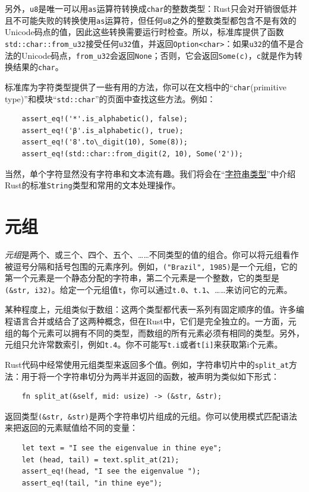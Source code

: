 另外，\texttt{u8}是唯一可以用\texttt{as}运算符转换成\texttt{char}的整数类型：Rust只会对开销很低并且不可能失败的转换使用\texttt{as}运算符，但任何\texttt{u8}之外的整数类型都包含不是有效的Unicode码点的值，因此这些转换需要运行时检查。所以，标准库提供了函数\texttt{std::char::from\_u32}接受任何\texttt{u32}值，并返回\texttt{Option<char>}：如果\texttt{u32}的值不是合法的Unicode码点，\texttt{from\_u32}会返回\texttt{None}；否则，它会返回\texttt{Some(c)}，\texttt{c}就是作为转换结果的\texttt{char}。

标准库为字符类型提供了一些有用的方法，你可以在文档中的“\texttt{char}(primitive type)”和模块“\texttt{std::char}”的页面中查找这些方法。例如：
\begin{verbatim}
    assert_eq!('*'.is_alphabetic(), false);
    assert_eq!('β'.is_alphabetic(), true);
    assert_eq!('8'.to\_digit(10), Some(8));
    assert_eq!(std::char::from_digit(2, 10), Some('2'));
\end{verbatim}

当然，单个字符显然没有字符串和文本流有趣。我们将会在“\hyperref[string]{字符串类型}”中介绍Rust的标准\texttt{String}类型和常用的文本处理操作。

\section{元组}
\emph{元组}是两个、或三个、四个、五个、……不同类型的值的组合。你可以将元组看作被逗号分隔和括号包围的元素序列。例如，\texttt{("Brazil", 1985)}是一个元组，它的第一个元素是一个静态分配的字符串，第二个元素是一个整数，它的类型是\texttt{(\&str, i32)}。给定一个元组值\texttt{t}，你可以通过\texttt{t.0}、\texttt{t.1}、……来访问它的元素。

某种程度上，元组类似于数组：这两个类型都代表一系列有固定顺序的值。许多编程语言合并或结合了这两种概念，但在Rust中，它们是完全独立的。一方面，元组的每个元素可以拥有不同的类型，而数组的所有元素必须有相同的类型。另外，元组只允许常数索引，例如\texttt{t.4}。你不可能写\texttt{t.i}或者\texttt{t[i]}来获取第i个元素。

Rust代码中经常使用元组类型来返回多个值。例如，字符串切片中的\texttt{split\_at}方法：用于将一个字符串切分为两半并返回的函数，被声明为类似如下形式：
\begin{verbatim}
    fn split_at(&self, mid: usize) -> (&str, &str);
\end{verbatim}

返回类型\texttt{(\&str, \&str)}是两个字符串切片组成的元组。你可以使用模式匹配语法来把返回的元素赋值给不同的变量：
\begin{verbatim}
    let text = "I see the eigenvalue in thine eye";
    let (head, tail) = text.split_at(21);
    assert_eq!(head, "I see the eigenvalue ");
    assert_eq!(tail, "in thine eye");
\end{verbatim}

